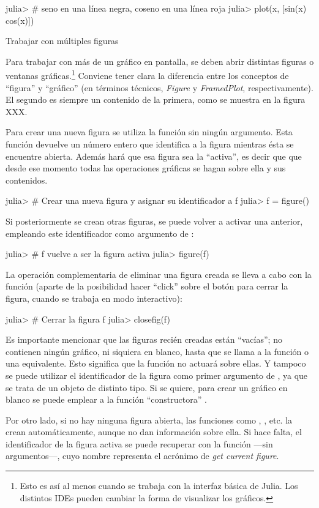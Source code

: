 ﻿\documentclass[spanish]{article}
\begin{document}
julia> # seno en una línea negra, coseno en una línea roja
julia> plot(x, [sin(x) cos(x)])


Trabajar con múltiples figuras

Para trabajar con más de un gráfico en pantalla, se deben abrir distintas
figuras o ventanas gráficas.\footnote{%
Esto es así al menos cuando se trabaja con la interfaz básica de Julia.
Los distintos IDEs pueden cambiar la forma de visualizar los gráficos.}%
Conviene tener clara la diferencia entre los conceptos de ``figura'' y
``gráfico'' (en términos técnicos, \emph{Figure} y \emph{FramedPlot},
respectivamente). El segundo es siempre un contenido de la primera,
como se muestra en la figura XXX.

Para crear una nueva figura se utiliza la función  sin ningún
argumento. Esta función devuelve un número entero que identifica a la figura
mientras ésta se encuentre abierta. Además hará que esa figura sea la
``activa'', es decir que que desde ese momento todas las operaciones gráficas
se hagan sobre ella y sus contenidos.

julia> # Crear una nueva figura y asignar su identificador a f
julia> f = figure()

Si posteriormente se crean otras figuras, se puede volver a activar una
anterior, empleando este identificador como argumento de :

julia> # f vuelve a ser la figura activa
julia> figure(f)

La operación complementaria de eliminar una figura creada se lleva a cabo
con la función  (aparte de la posibilidad hacer ``click''
sobre el botón para cerrar la figura, cuando se trabaja en modo interactivo):

julia> # Cerrar la figura f
julia> closefig(f)

Es importante mencionar que las figuras recién creadas están
``vacías''; no contienen ningún gráfico, ni siquiera en blanco, hasta
que se llama a la función  o una equivalente. Esto significa que
la función  no actuará sobre ellas. Y tampoco se puede utilizar
el identificador de la figura como primer argumento de , ya que
se trata de un objeto de distinto tipo. Si se quiere, para crear un gráfico
en blanco se puede emplear a la función ``constructora'' .

Por otro lado, si no hay ninguna figura abierta, las funciones como
, , etc. la crean automáticamente, aunque
no dan información sobre ella. Si hace falta, el identificador
de la figura activa se puede recuperar con la función  ---sin
argumentos---, cuyo nombre representa el acrónimo de \emph{get current figure}.
\end{document}
